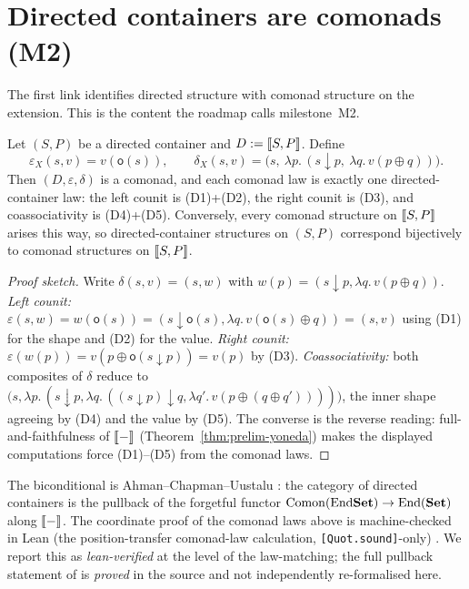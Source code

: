 \section{Directed containers are comonads (M2)}\label{sec:chain-comonad}

The first link identifies directed structure with comonad structure on the
extension. This is the content the roadmap calls milestone~M2.

\begin{proposition}\label{thm:chain-comonad}
Let $(S,P)$ be a directed container and $D:=\llbracket S,P \rrbracket$. Define
\[
  \varepsilon_X(s,v)=v(\mathsf o(s)),\qquad
  \delta_X(s,v)=\big(s,\ \lambda p.\,(s\downarrow p,\ \lambda q.\,v(p\oplus q))\big).
\]
Then $(D,\varepsilon,\delta)$ is a comonad, and each comonad law is exactly one
directed-container law: the left counit is \textup{(D1)+(D2)}, the right counit
is \textup{(D3)}, and coassociativity is \textup{(D4)+(D5)}. Conversely, every
comonad structure on $\llbracket S,P \rrbracket$ arises this way, so directed-container
structures on $(S,P)$ correspond bijectively to comonad structures on
$\llbracket S,P \rrbracket$.
\end{proposition}

\begin{proof}[Proof sketch]
Write $\delta(s,v)=(s,w)$ with $w(p)=(s\downarrow p,\lambda q.\,v(p\oplus q))$.
\emph{Left counit:}
$\varepsilon(s,w)=w(\mathsf o(s))=(s\downarrow\mathsf o(s),\lambda q.\,v(\mathsf o(s)\oplus q))
=(s,v)$ using (D1) for the shape and (D2) for the value. \emph{Right counit:}
$\varepsilon(w(p))=v(p\oplus\mathsf o(s\downarrow p))=v(p)$ by (D3).
\emph{Coassociativity:} both composites of $\delta$ reduce to
$\big(s,\lambda p.\,(s\downarrow p,\lambda q.\,((s\downarrow p)\downarrow q,
\lambda q'.\,v(p\oplus(q\oplus q'))))\big)$, the inner shape agreeing by (D4) and
the value by (D5). The converse is the reverse reading: full-and-faithfulness of
$\llbracket - \rrbracket$ (Theorem~\ref{thm:prelim-yoneda}) makes the displayed computations
force (D1)--(D5) from the comonad laws.
\end{proof}

\begin{remark}\label{rem:chain-M2}
The biconditional is Ahman--Chapman--Uustalu \cite[Thm.\ 3.15]{ACU14}: the
category of directed containers is the pullback of the forgetful functor
$\mathrm{Comon}(\mathrm{End}\mathbf{Set})\to\mathrm{End}(\mathbf{Set})$ along $\llbracket - \rrbracket$. The coordinate proof of
the comonad laws above is machine-checked in Lean (the position-transfer
comonad-law calculation, \texttt{[Quot.sound]}-only) \cite{MacBethBase}. We
report this as \emph{lean-verified} at the level of the law-matching; the full
pullback statement of \cite{ACU14} is \emph{proved} in the source and not
independently re-formalised here.
\end{remark}


